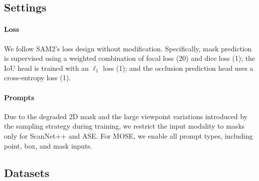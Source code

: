 \subsection{Settings}

\paragraph{Loss}
We follow SAM2's loss design without modification.  
Specifically, mask prediction is supervised using a weighted combination of focal loss (20) and dice loss (1);  
the IoU head is trained with an $\ell_{1}$ loss (1);  
and the occlusion prediction head uses a cross-entropy loss (1).

\paragraph{Prompts}
Due to the degraded 2D mask and the large viewpoint variations introduced by the sampling strategy during training, we restrict the input modality to masks only for ScanNet++ and ASE. For MOSE, we enable all prompt types, including point, box, and mask inputs.

\subsection{Datasets}
